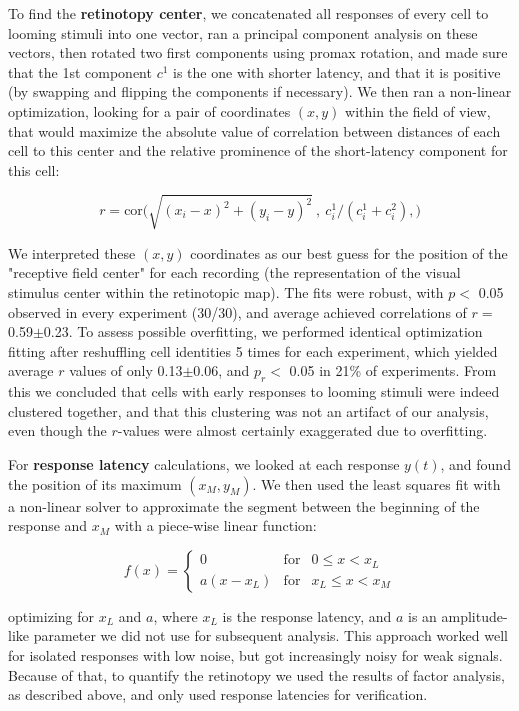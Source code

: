 \documentclass{article}
\begin{document}
To find the \textbf{retinotopy center}, we concatenated all responses of every cell to looming stimuli into one vector, ran a principal component analysis on these vectors, then rotated two first components using promax rotation, and made sure that the 1st component $c^1$ is the one with shorter latency, and that it is positive (by swapping and flipping the components if necessary). We then ran a non-linear optimization, looking for a pair of coordinates $(x,y)$ within the field of view, that would maximize the absolute value of correlation between distances of each cell to this center and the relative prominence of the short-latency component for this cell:

\[ r = \text{cor}\big(\sqrt{(x_i-x)^2+(y_i-y)^2}\ ,\ c^1_i/(c^1_i + c^2_i), \big) \]

We interpreted these $(x,y)$ coordinates as our best guess for the position of the "receptive field center" for each recording (the representation of the visual stimulus center within the retinotopic map). The fits were robust, with $p<$ 0.05 observed in every experiment (30/30), and average achieved correlations of $r=$ 0.59$\pm$0.23. To assess possible overfitting, we performed identical optimization fitting  after reshuffling cell identities 5 times for each experiment, which yielded average $r$ values of only 0.13$\pm$0.06, and $p_r<$ 0.05 in 21\% of experiments. From this we concluded that cells with early responses to looming stimuli were indeed clustered together, and that this clustering was not an artifact of our analysis, even though the $r$-values were almost certainly exaggerated due to overfitting.

For \textbf{response latency} calculations, we looked at each response $y(t)$, and found the position of its maximum $(x_M, y_M)$. We then used the least squares fit with a non-linear solver to approximate the segment between the beginning of the response and $x_M$ with a piece-wise linear function:

\[ f(x) = \left \{ \begin{array}{cll} 0 & \text{for} & 0 \leqslant x<x_L \\
a (x-x_L) & \text{for} & x_L\leqslant x < x_M \end{array} \right. \]

optimizing for $x_L$ and $a$, where $x_L$ is the response latency, and $a$ is an amplitude-like parameter we did not use for subsequent analysis. This approach worked well for isolated responses with low noise, but got increasingly noisy for weak signals. Because of that, to quantify the retinotopy we used the results of factor analysis, as described above, and only used response latencies for verification.
\end{document}
